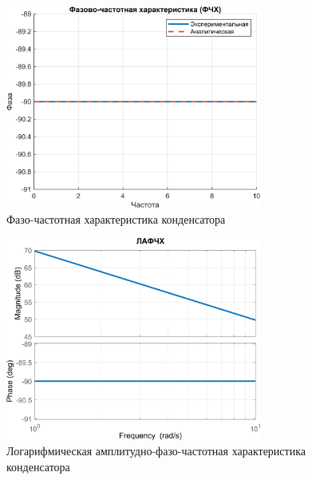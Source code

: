 \begin{figure}[H]
    \centering
    \includegraphics[width=0.75\textwidth, trim={0cm 0cm 0cm 0cm}]{../images/3_4.png}
    \caption{Фазо-частотная характеристика конденсатора}
\end{figure}

\begin{figure}[H]
    \centering
    \includegraphics[width=0.75\textwidth, trim={0cm 0cm 0cm 0cm}]{../images/3_5.png}
    \caption{Логарифмическая амплитудно-фазо-частотная характеристика конденсатора}
\end{figure}
\endinput